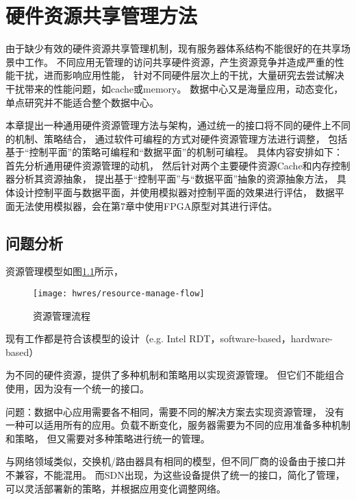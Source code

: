 

\chapter{硬件资源共享管理方法}
\label{chap:hwresman}

由于缺少有效的硬件资源共享管理机制，现有服务器体系结构不能很好的在共享场景中工作。
不同应用无管理的访问共享硬件资源，产生资源竞争并造成严重的性能干扰，进而影响应用性能，
针对不同硬件层次上的干扰，大量研究去尝试解决干扰带来的性能问题，如cache\cite{}或memory\cite{}。
数据中心又是海量应用，动态变化，单点研究并不能适合整个数据中心。

本章提出一种通用硬件资源管理方法与架构，通过统一的接口将不同的硬件上不同的机制、策略结合，
通过软件可编程的方式对硬件资源管理方法进行调整，
包括基于``控制平面''的策略可编程和``数据平面''的机制可编程。
具体内容安排如下：
首先分析通用硬件资源管理的动机，
然后针对两个主要硬件资源Cache和内存控制器分析其资源抽象，
提出基于``控制平面''与``数据平面''抽象的资源抽象方法，
具体设计控制平面与数据平面，并使用模拟器对控制平面的效果进行评估，
数据平面无法使用模拟器，会在第7章中使用FPGA原型对其进行评估。


\section{问题分析}

资源管理模型如图\ref{fig:resource-manage-flow}所示，

\begin{figure}[tb]
  \centering
  \texttt{[image: hwres/resource-manage-flow]}
  \caption{资源管理流程}
  \label{fig:resource-manage-flow}
\end{figure}

现有工作都是符合该模型的设计（e.g. Intel RDT，software-based，hardware-based）

为不同的硬件资源，提供了多种机制和策略用以实现资源管理。
但它们不能组合使用，因为没有一个统一的接口。

问题：数据中心应用需要各不相同，需要不同的解决方案去实现资源管理，
没有一种可以适用所有的应用。负载不断变化，服务器需要为不同的应用准备多种机制和策略，
但又需要对多种策略进行统一的管理。

与网络领域类似，交换机/路由器具有相同的模型，但不同厂商的设备由于接口并不兼容，不能混用。
而SDN出现，为这些设备提供了统一的接口，简化了管理，可以灵活部署新的策略，并根据应用变化调整网络。

